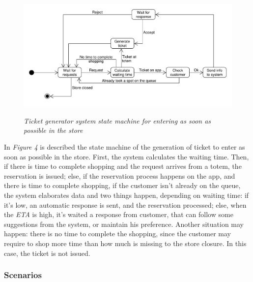 \documentclass{article}
\begin{document}
		\bigskip
		
		\begin{figure}[!h]
			
			\centering
			\hspace*{-1.9cm}\includegraphics[scale=0.55]{StateCharts/ticket_generation_system.pdf} \\
			\caption{\emph{Ticket generator system state machine for entering as soon as possible in the store}}
			
		\end{figure}
	
		In \emph{Figure 4} is described the state machine of the generation of ticket to enter as soon as possible in the store. First, the system calculates the waiting time. Then, if there is time to complete shopping and the request arrives from a totem, the reservation is issued; else, if the reservation process happens on the app, and there is time to complete shopping, if the customer isn't already on the queue, the system elaborates data and two things happen, depending on waiting time: if it's low, an automatic response is sent, and the reservation processed; else, when the \emph{ETA} is high, it's waited a response from customer, that can follow some suggestions from the system, or maintain his preference. Another situation may happen: there is no time to complete the shopping, since the customer may require to shop more time than how much is missing to the store closure. In this case, the ticket is not issued.

	\newpage
	\subsubsection{Scenarios}
	
\end{document}
